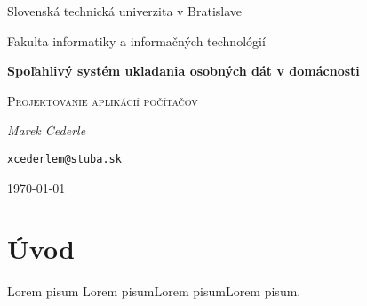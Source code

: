 \documentclass[12pt,oneside,slovak,a4paper]{article}
\begin{document}
\linespread{1.5}\selectfont

\begin{titlepage}
	\centering
    {\Large Slovenská technická univerzita v Bratislave\par}
    {\Large Fakulta informatiky a informačných technológií\par}
	\vspace{7cm}
	{\huge\bfseries Spoľahlivý systém ukladania osobných dát v domácnosti\par}
	\vspace{0.5cm}
    {\Large \textsc{Projektovanie aplikácií počítačov}\par}
    \vspace{1cm}
	{\Large\itshape Marek Čederle\par}
    {\small\texttt{xcederlem@stuba.sk}\par}
	\vfill

	{\large \today\par}
\end{titlepage}




\newpage
\vspace*{\fill}
\begin{abstract}
    Cieľom môjho projektu bude zamerať sa, akým spôsobom si môže bežný človek sprevádzkovať spoľahlivý systém na ukladanie, prípadne zálohovanie dát. Bude sa jednať o návrh a sprevádzkovanie dátového servera (NAS) v domácnosti, ktorý sa bude skladať z bežných počítačových komponentov a jeho zapojenia v počítačovej sieti vrátane potrebnej kabeláže. Neoddeliteľnou súčasťou môjho projektu bude vhodný výber SW riešenia, ktoré bude na tomto HW ``bežať''. Taktiež pôjde o jeho umiestnenie v domácnosti vzhľadom na hlučnosť tohto systému. Na záver by som chcel porovnať cenu s konkurencieschopným komerčným riešením.
\end{abstract}
\vspace*{\fill}
\newpage

\tableofcontents
\vspace*{\fill}


\nocite{*}

\section{Úvod}
Lorem pisum Lorem pisumLorem pisumLorem pisum.
\end{document}
